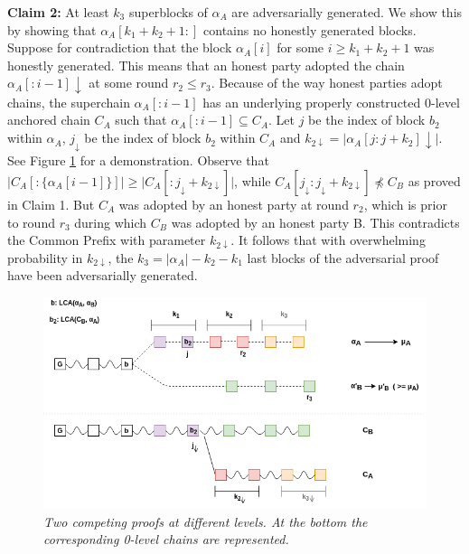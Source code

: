 \documentclass[11pt,a4paper]{article}
\begin{document}
\textbf{Claim 2:} At least $k_3$ superblocks of $\alpha_A$ are adversarially generated. We show this by showing that $\alpha_A[k_1 + k_2 + 1:]$ contains no honestly generated blocks. Suppose for contradiction that the block $\alpha_A[i]$ for some $i \geq k_1 + k_2 + 1$ was honestly generated. This means that an honest party adopted the chain $\alpha_A[:i - 1]\downarrow$ at some round $r_2 \leq r_3$. Because of the way honest parties adopt chains, the superchain $\alpha_A[:i - 1]$ has an underlying properly constructed 0-level anchored chain $C_A$ such that $\alpha_A[:i - 1] \subseteq C_A$. Let $j$ be the index of block $b_2$ within $\alpha_A$, $j_\downarrow$ be the index of block $b_2$ within $C_A$ and $k_{2\downarrow} = \vert \alpha_A[j:j+k_2]\downarrow\vert$. See Figure \ref{fig:proof} for a demonstration. Observe that $\vert C_A[:\{\alpha_A[i-1]\}] \vert \geq \vert C_A[:{j_\downarrow}+k_{2\downarrow}] \vert$, while $C_A[j_\downarrow:j_\downarrow + k_{2\downarrow}] \npreceq C_B$ as proved in Claim 1. But $C_A$ was adopted by an honest party at round $r_2$, which is prior to round $r_3$ during which $C_B$ was adopted by an honest party B. This contradicts the Common Prefix\cite{Backbone} with parameter $k_{2\downarrow}$. It follows that with overwhelming probability in $k_{2\downarrow}$, the $k_3 = \vert \alpha_A \vert - k_2 - k_1$ last blocks of the adversarial proof have been adversarially generated.\\

\begin{figure}[h]
	\begin{center}
		\includegraphics[scale=0.5]{figures/proof.png}
	\end{center}
	\caption{\textit{Two competing proofs at different levels. At the bottom the corresponding 0-level chains are represented.}}
	\label{fig:proof}
\end{figure}
\end{document}
